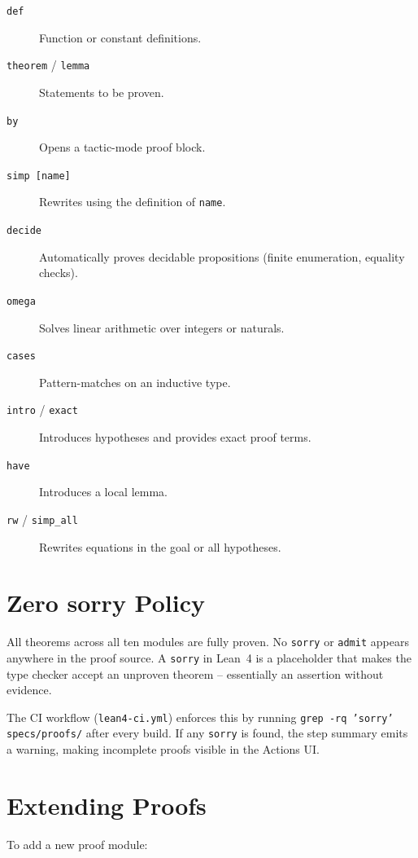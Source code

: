 \begin{description}
  \item[{\texttt{def}}] Function or constant definitions.
  \item[{\texttt{theorem} / \texttt{lemma}}] Statements to be proven.
  \item[{\texttt{by}}] Opens a tactic-mode proof block.
  \item[{\texttt{simp [name]}}] Rewrites using the definition of
        \texttt{name}.
  \item[{\texttt{decide}}] Automatically proves decidable propositions
        (finite enumeration, equality checks).
  \item[{\texttt{omega}}] Solves linear arithmetic over integers or
        naturals.
  \item[{\texttt{cases}}] Pattern-matches on an inductive type.
  \item[{\texttt{intro} / \texttt{exact}}] Introduces hypotheses and
        provides exact proof terms.
  \item[{\texttt{have}}] Introduces a local lemma.
  \item[{\texttt{rw} / \texttt{simp\_all}}] Rewrites equations in the
        goal or all hypotheses.
\end{description}

\section{Zero sorry Policy}

All theorems across all ten modules are fully proven.  No \texttt{sorry}
or \texttt{admit} appears anywhere in the proof source.  A \texttt{sorry}
in Lean~4 is a placeholder that makes the type checker accept an
unproven theorem -- essentially an assertion without evidence.

The CI workflow (\texttt{lean4-ci.yml}) enforces this by running
\texttt{grep -rq 'sorry' specs/proofs/} after every build.  If any
\texttt{sorry} is found, the step summary emits a warning, making
incomplete proofs visible in the Actions UI.

\section{Extending Proofs}

To add a new proof module:


